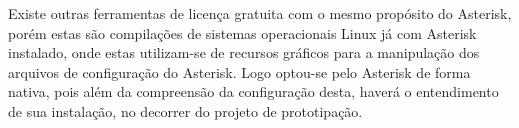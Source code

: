 Existe outras ferramentas de licença gratuita com o mesmo propósito do Asterisk, porém estas são compilações de sistemas operacionais Linux já com Asterisk instalado, onde estas utilizam-se de recursos gráficos para a manipulação dos arquivos de configuração do Asterisk. Logo optou-se pelo Asterisk de forma nativa, pois além da compreensão da configuração desta, haverá o entendimento de sua instalação, no decorrer do projeto de prototipação.

































